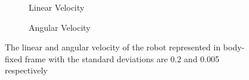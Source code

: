 \documentclass[letterpaper,12pt]{article}
\begin{document}
\begin{figure}[H]
    \centering
    \begin{subfigure}[b]{8.cm}
        \centering
        \captionsetup{justification=centering}
        \caption{Linear Velocity}
        \label{fig:kermit}
    \end{subfigure}
    \begin{subfigure}[b]{8.cm}
        \centering
        \captionsetup{justification=centering}
        \caption{Angular Velocity}
        \label{fig:rana}
    \end{subfigure}
\caption{The linear and angular velocity of the robot represented in body-fixed frame with the standard deviations are 0.2 and 0.005 respectively}
\label{fig:map2_4}
\end{figure}
\end{document}
